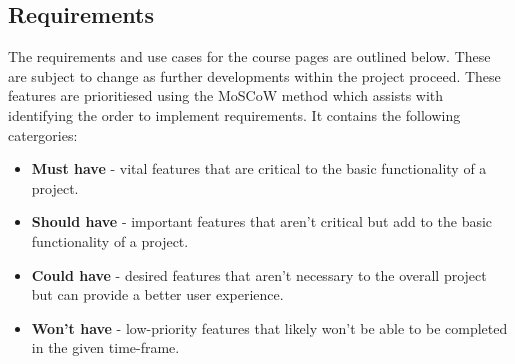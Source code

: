 \subsection{Requirements}
The requirements and use cases for the course pages are outlined below. These are subject to change as further developments within the project proceed.
These features are prioritiesed using the MoSCoW method which assists with identifying the order to implement requirements.
It contains the following catergories:
\begin{itemize}
    \item \textbf{Must have} - vital features that are critical to the basic functionality of a project.
    \item \textbf{Should have} - important features that aren't critical but add to the basic functionality of a project.
    \item \textbf{Could have} - desired features that aren't necessary to the overall project but can provide a better user experience.
    \item \textbf{Won't have} - low-priority features that likely won't be able to be completed in the given time-frame.
\end{itemize}

